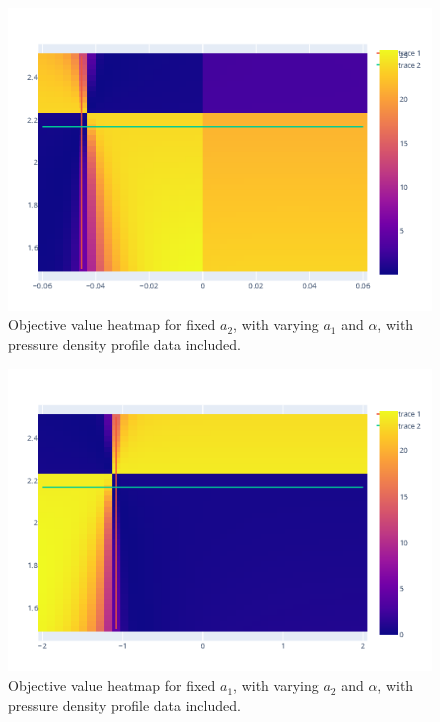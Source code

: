 \begin{figure}[h!]
    \centering
    \includegraphics[scale=0.7]{imgs/c4/heat-2-with-pressure.png}
    \caption{Objective value heatmap for fixed $a_2$, with varying 
    $a_1$ and $\alpha$, with pressure density profile data included.}
    \label{heat-2-both}
\end{figure}

\begin{figure}[h!]
    \centering
    \includegraphics[scale=0.7]{imgs/c4/heat-3-with-pressure.png}
    \caption{Objective value heatmap for fixed $a_1$, with varying 
    $a_2$ and $\alpha$, with pressure density profile data included.}
    \label{heat-3-both}
\end{figure}\newpage